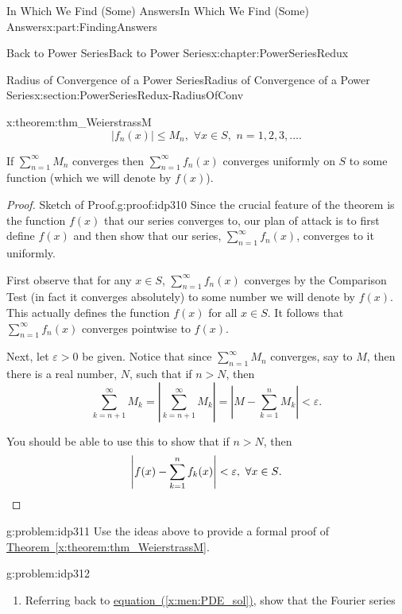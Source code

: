 \documentclass[oneside,10pt,]{book}
\newcommand{\xreffont}{\relax}
\numberwithin{equation}{section}
\newcommand{\qedhere}{\relax}
\newcommand{\abs}[1]{\left|#1\right|}
\newcommand{\eps}{\varepsilon}
\newcommand{\lt}{<}
\begin{document}
\begin{partptx}{In Which We Find (Some) Answers}{}{In Which We Find (Some) Answers}{}{}{x:part:FindingAnswers}
\begin{chapterptx}{Back to Power Series}{}{Back to Power Series}{}{}{x:chapter:PowerSeriesRedux}
\begin{sectionptx}{Radius of Convergence of a Power Series}{}{Radius of Convergence of a Power Series}{}{}{x:section:PowerSeriesRedux-RadiusOfConv}
\begin{theorem}{}{}{x:theorem:thm_WeierstrassM}
\begin{equation*}
\abs{f_n(x)}\leq M_n,\,\, \forall x\in S,\,\, n=1, 2, 3, \ldots\text{.}
\end{equation*}
%
\par
If \(\sum_{n=1}^\infty M_n\) converges then \(\sum_{n=1}^\infty f_n(x)\) converges uniformly on \(S\) to some function (which we will denote by \(f(x)\)).%
\end{theorem}
\begin{proof}{Sketch of Proof.}{g:proof:idp310}
Since the crucial feature of the theorem is the function \(f(x)\) that our series converges to, our plan of attack is to first define \(f(x)\) and then show that our series, \(\sum_{n=1}^\infty f_n(x)\), converges to it uniformly.%
\par
First observe that for any \(x\in S\), \(\sum_{n=1}^\infty f_n(x)\) converges by the Comparison Test (in fact it converges absolutely) to some number we will denote by \(f(x)\). This actually defines the function \(f(x)\) for all \(x\in S\). It follows that \(\sum_{n=1}^\infty f_n(x)\) converges pointwise to \(f(x)\).%
\par
Next, let \(\eps>0\) be given. Notice that since \(\sum_{n=1}^\infty M_n\) converges, say to \(M\), then there is a real number, \(N\), such that if \(n>N\), then%
\begin{equation*}
\sum_{k=n+1}^\infty M_k = \abs{\sum_{k=n+1}^\infty M_k} = \abs{M-\sum_{k=1}^n M_k}\lt \eps\text{.}
\end{equation*}
%
\par
You should be able to use this to show that if \(n>N\), then%
\begin{equation*}
\abs{f(x) - \sum_{k=1}^n f_k(x)}\lt  \eps, \, \, \forall x\in S\text{.}\qedhere
\end{equation*}
%
\end{proof}
\begin{problem}{}{g:problem:idp311}%
 Use the ideas above to provide a formal proof of \hyperref[x:theorem:thm_WeierstrassM]{Theorem~{\xreffont\ref{x:theorem:thm_WeierstrassM}}}.%
\end{problem}
\begin{problem}{}{g:problem:idp312}%
\begin{enumerate}[font=\bfseries,label=(\alph*),ref=\alph*]
\item{}Referring back to \hyperref[x:men:PDE_sol]{equation~({\xreffont\ref{x:men:PDE_sol}})}, show that the Fourier series%
\begin{equation*}

\end{equation*}
\end{enumerate}
\end{problem}
\end{sectionptx}
\end{chapterptx}
\end{partptx}
\end{document}
